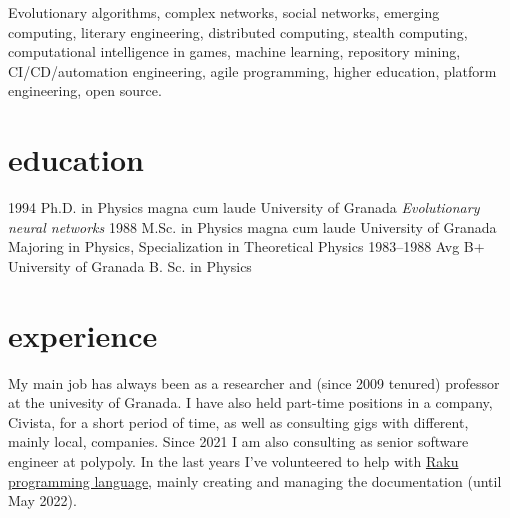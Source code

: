 \documentclass[]{friggeri-jj-cv}
\begin{document}
Evolutionary algorithms, complex networks, social networks, emerging
computing, literary engineering, distributed computing, stealth
computing, computational intelligence in games, machine learning,
repository mining, CI/CD/automation engineering, agile programming,
higher education, platform engineering, open source.

\section{education}

\begin{entrylist}
  \entry
    {1994}
    {Ph.D. {\normalfont in Physics} magna cum laude}
    {University of Granada}
    {\emph{Evolutionary neural networks}}
  \entry
    {1988}
    {M.Sc. {\normalfont in Physics} magna cum laude}
    {University of Granada}
    {Majoring in Physics, Specialization in Theoretical Physics}
  \entry
    {1983–1988}
    {Avg B+}
    {University of Granada}
    {B. Sc. in Physics}
\end{entrylist}

\section{experience}

My main job has always been as a researcher and (since 2009 tenured)
professor at the univesity of Granada. I have also held part-time
positions in a company, Civista, for a short period of time, as well
as consulting gigs with different, mainly local, companies. Since 2021 I am also
consulting as senior software engineer at polypoly.
In the last  years I've volunteered to help with
\href{https://raku.org}{Raku programming language}, mainly creating
and managing the documentation (until May 2022).
\end{document}
